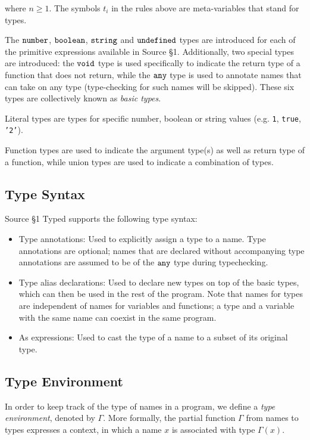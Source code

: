 \noindent
where $n \geq 1$. The symbols $t_i$ in the rules above are meta-variables that stand for types.

The $\texttt{number}$, $\texttt{boolean}$, $\texttt{string}$ and $\texttt{undefined}$ types are introduced for each of
the primitive expressions available in Source \S 1. Additionally, two special types are introduced:
the $\texttt{void}$ type is used specifically to indicate the return type of a function that does not return,
while the $\texttt{any}$ type is used to annotate names that can take on any type (type-checking for such names will be skipped).
These six types are collectively known as \emph{basic types}.

Literal types are types for specific number, boolean or string values
(e.g. \texttt{1}, \texttt{true}, \texttt{'2'}).

Function types are used to indicate the argument type(s) as well as return type of a function,
while union types are used to indicate a combination of types.

\subsection{Type Syntax}

Source \S 1 Typed supports the following type syntax:

\begin{itemize}
\item Type annotations: Used to explicitly assign a type to a name. Type annotations are optional;
names that are declared without accompanying type annotations are assumed to be of the $\texttt{any}$ type during typechecking.
\item Type alias declarations: Used to declare new types on top of the basic types,
which can then be used in the rest of the program. Note that names for types are independent of names for variables and functions;
a type and a variable with the same name can coexist in the same program.
\item As expressions: Used to cast the type of a name to a subset of its original type.
\end{itemize}

\subsection{Type Environment}

In order to keep track of the type of names in a program, we define a
\emph{type environment}, denoted by $\Gamma$. More
formally,
the partial function $\Gamma$ from names to types expresses a 
context, in which a name $x$ is associated with type $\Gamma(x)$. 

